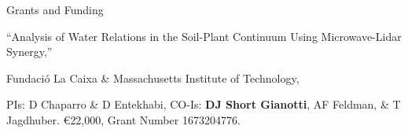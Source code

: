 \begin{rubric}{Grants and Funding}
\begin{hangparas}{1em}{1}
    \end{hangparas}
%
        \begin{hangparas}{1em}{1}
            \par ``Analysis of Water Relations in the Soil-Plant Continuum Using Microwave-Lidar Synergy,'' 
            \par Fundaci\'{o} La Caixa \& Massachusetts Institute of Technology, 
            \par PIs: D Chaparro \& D Entekhabi, CO-Is: \textbf{DJ Short Gianotti}, AF Feldman, \& T Jagdhuber. \euro{22,000}, Grant Number 1673204776.
        \end{hangparas}
%
\end{rubric}
